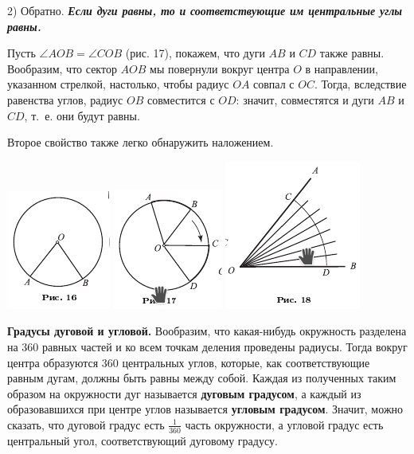 \documentclass[oneside]{book}
\begin{document}
2) Обратно.
\textbf{\emph{Если дуги равны, то и соответствующие им центральные углы равны.}}

Пусть $\angle AOB=\angle COB$ (рис. 17), покажем, что дуги $AB$ и $CD$ также равны.
Вообразим, что сектор $AOB$ мы повернули вокруг центра $O$ в направлении, указанном стрелкой, настолько, чтобы радиус $OA$ совпал с $OC$.
Тогда, вследствие равенства углов, радиус $OB$ совместится с $OD$:
значит, совместятся и дуги $AB$ и $CD$, т.~е.
они будут равны.

Второе свойство также легко обнаружить наложением.

\includegraphics{pics/ris-16}
\includegraphics{pics/ris-17}
\includegraphics{pics/ris-18}

\textbf{Градусы дуговой и угловой.}
Вообразим, что какая-нибудь окружность разделена на 360 равных частей и ко всем точкам деления проведены радиусы.
Тогда вокруг центра образуются 360 центральных углов, которые, как соответствующие равным дугам, должны быть равны между собой.
Каждая из полученных таким образом на окружности дуг называется \textbf{дуговым градусом}, а каждый из образовавшихся при центре углов называется \textbf{угловым градусом}.
Значит, можно сказать, что дуговой градус есть $\tfrac1{360}$ часть окружности, а угловой градус есть центральный угол, соответствующий дуговому градусу.
\end{document}
